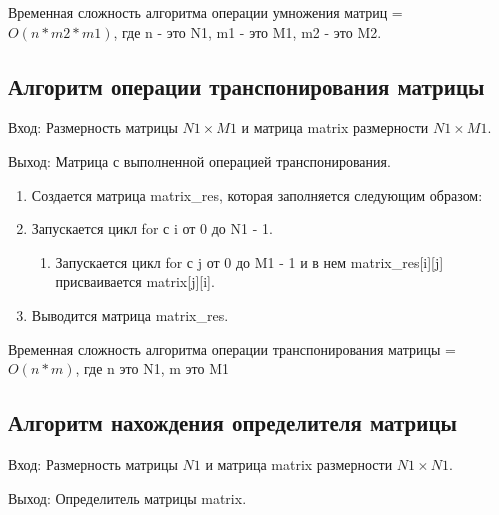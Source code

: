 \documentclass[bachelor, och, labwork]{shiza}
\begin{document}
	Временная сложность алгоритма операции умножения матриц = $O(n * m2 * m1)$, где n - это N1, m1 - это M1, m2 - это M2.

	\subsection{Алгоритм операции транспонирования матрицы}
	
			$\textit{Вход:}$ Размерность матрицы $N1 \times M1$ и матрица matrix размерности $N1 \times M1$.

			$\textit{Выход:}$  Матрица с выполненной операцией транспонирования.		
	
	\begin{enumerate} 
		\item Создается матрица matrix\_res, которая заполняется следующим образом:
		\item Запускается цикл for с i от 0 до N1 - 1.
		\begin{enumerate} 
			\item Запускается цикл for с j от 0 до M1 - 1 и в нем   matrix\_res[i][j] присваивается matrix[j][i].
		\end{enumerate}
		\item Выводится матрица matrix\_res.
	\end{enumerate} 
	
	Временная сложность алгоритма операции транспонирования матрицы = $O(n * m)$, где n это N1, m это M1
	
	\subsection{Алгоритм нахождения определителя матрицы}

	$\textit{Вход:}$ Размерность матрицы $N1$ и матрица matrix размерности $N1 \times N1$.
	
	$\textit{Выход:}$  Определитель матрицы matrix.	
\end{document}
